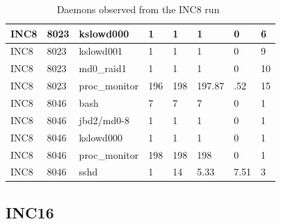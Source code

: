 \begin{table}[h]
\begin{center}
{\begin{tabular}{l|l|l|l|l|l|l|l}
INC8     & 8023     & kslowd000     & 1     & 1     & 1     & 0     & 6\\ \hline
INC8     & 8023     & kslowd001     & 1     & 1     & 1     & 0     & 9\\ \hline
INC8     & 8023     & md0\_raid1     & 1     & 1     & 1     & 0     & 10\\ \hline
INC8     & 8023     & proc\_monitor     & 196     & 198     & 197.87     & .52     & 15\\ \hline \hline

INC8     & 8046     & bash     & 7     & 7     & 7     & 0     & 1\\ \hline
INC8     & 8046     & jbd2/md0-8     & 1     & 1     & 1     & 0     & 1\\ \hline
INC8     & 8046     & kslowd000     & 1     & 1     & 1     & 0     & 1\\ \hline
INC8     & 8046     & proc\_monitor     & 198     & 198     & 198     & 0     & 1\\ \hline
INC8     & 8046     & sshd     & 1     & 14     & 5.33     & 7.51     & 3\\ \hline \hline
\end{tabular}
}
\end{center}
\caption{Daemons observed from the INC8 run~\label{tab:inc8_daemons}}
\end{table}

\pagebreak

\subsection{INC16}

